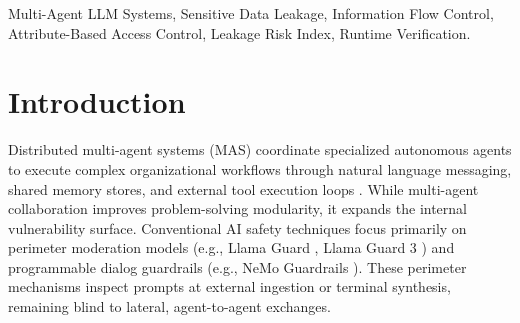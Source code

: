 \documentclass[conference]{IEEEtran}
\begin{document}
\maketitle

\begin{abstract}
Autonomous multi-agent Large Language Model (LLM) architectures decompose enterprise objectives into cooperative execution graphs involving intermediate scratchpads, shared persistent memory, and dynamic tool calls. However, unconstrained internal communication channels introduce severe privacy risks, including confidential data leakage, privilege escalation, and tool-assisted exfiltration. While perimeter guardrails filter external user-facing endpoints, internal coordination channels can propagate sensitive records without triggering boundary defenses. To address this challenge, this paper presents PrivAgentShield, a policy-aware runtime mediation framework combining dynamic Information Flow Control (IFC) with Attribute-Based Access Control (ABAC). We formalize the Leakage Risk Index ($LRI^*$), a non-compensatory minimax metric unifying payload sensitivity ($T^*_m$), lattice clearance dominance ($\Delta^*_{ij}$), and downstream egress reachability ($\Pi^*_j$) modeled via absorbing Markov chains. Deployed as an inline reverse proxy with a three-tier cascaded inspection engine (regular expressions with Shannon entropy, named-entity recognition, and transformer verification), PrivAgentShield dynamically executes ALLOW, SANITIZE (via session-consistent pseudonymization), and QUARANTINE actions without model retraining. We evaluate PrivAgentShield across a multi-agent benchmark of 31 labeled execution traces spanning ten attack scenarios, demonstrating a 65.0\% privacy leakage prevention rate, 74.2\% task completion preservation, and a mean runtime latency of 1.66\,ms.
\end{abstract}

\begin{IEEEkeywords}
Multi-Agent LLM Systems, Sensitive Data Leakage, Information Flow Control, Attribute-Based Access Control, Leakage Risk Index, Runtime Verification.
\end{IEEEkeywords}

\section{Introduction}
Distributed multi-agent systems (MAS) coordinate specialized autonomous agents to execute complex organizational workflows through natural language messaging, shared memory stores, and external tool execution loops \cite{1}. While multi-agent collaboration improves problem-solving modularity, it expands the internal vulnerability surface. Conventional AI safety techniques focus primarily on perimeter moderation models (e.g., Llama Guard \cite{15}, Llama Guard 3 \cite{16}) and programmable dialog guardrails (e.g., NeMo Guardrails \cite{17}). These perimeter mechanisms inspect prompts at external ingestion or terminal synthesis, remaining blind to lateral, agent-to-agent exchanges.
\end{document}
